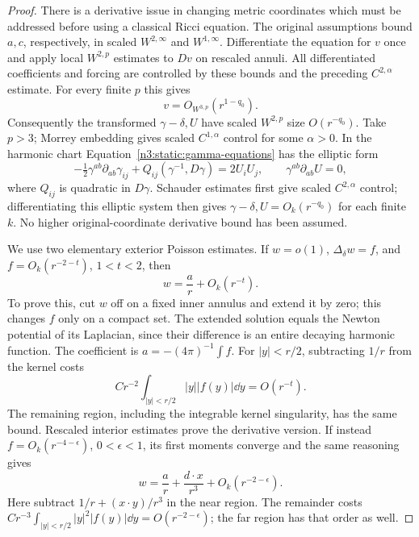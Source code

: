 \begin{proof}
There is a derivative issue in changing metric coordinates which
must be addressed before using a classical Ricci equation.
The original assumptions bound \(a,c\), respectively, in scaled
\(W^{2,\infty}\) and \(W^{1,\infty}\).
Differentiate the equation for \(v\) once and apply local
\(W^{2,p}\) estimates to \(Dv\) on rescaled annuli.
All differentiated coefficients and forcing are controlled by
these bounds and the preceding \(C^{2,\alpha}\) estimate.
For every finite \(p\) this gives
\[
v=O_{W^{3,p}}(r^{1-q_0}).
\]
Consequently the transformed \(\gamma-\delta,U\) have scaled
\(W^{2,p}\) size \(O(r^{-q_0})\).
Take \(p>3\); Morrey embedding gives scaled \(C^{1,\alpha}\)
control for some \(\alpha>0\).
In the harmonic chart Equation~\eqref{n3:static:gamma-equations}
has the elliptic form
\[
-\tfrac12\gamma^{ab}\partial_{ab}\gamma_{ij}
 +Q_{ij}(\gamma^{-1},D\gamma)=2U_iU_j,\qquad
\gamma^{ab}\partial_{ab}U=0,
\]
where \(Q_{ij}\) is quadratic in \(D\gamma\).
Schauder estimates first give scaled \(C^{2,\alpha}\) control;
differentiating this elliptic system then gives
\(\gamma-\delta,U=O_k(r^{-q_0})\) for each finite \(k\).
No higher original-coordinate derivative bound has been assumed.

We use two elementary exterior Poisson estimates.
If \(w=o(1)\), \(\Delta_\delta w=f\), and
\(f=O_k(r^{-2-t})\), \(1<t<2\), then
\begin{equation}
\label{n3:static:poisson-monopole}
w=\frac ar+O_k(r^{-t}).
\end{equation}
To prove this, cut \(w\) off on a fixed inner annulus and extend it
by zero; this changes \(f\) only on a compact set.
The extended solution equals the Newton potential of its Laplacian,
since their difference is an entire decaying harmonic function.
The coefficient is \(a=-(4\pi)^{-1}\int f\).
For \(|y|<r/2\), subtracting \(1/r\) from the kernel costs
\[
Cr^{-2}\int_{|y|<r/2}|y||f(y)|\dd y=O(r^{-t}).
\]
The remaining region, including the integrable kernel singularity,
has the same bound. Rescaled interior estimates prove the derivative
version.
If instead \(f=O_k(r^{-4-\epsilon})\), \(0<\epsilon<1\), its first
moments converge and the same reasoning gives
\begin{equation}
\label{n3:static:poisson-dipole}
w=\frac ar+\frac{d\cdot x}{r^3}+O_k(r^{-2-\epsilon}).
\end{equation}
Here subtract \(1/r+(x\cdot y)/r^3\) in the near region.
The remainder costs
\(Cr^{-3}\int_{|y|<r/2}|y|^2|f(y)|\dd y
 =O(r^{-2-\epsilon})\); the far region has that order as well.


\end{proof}

